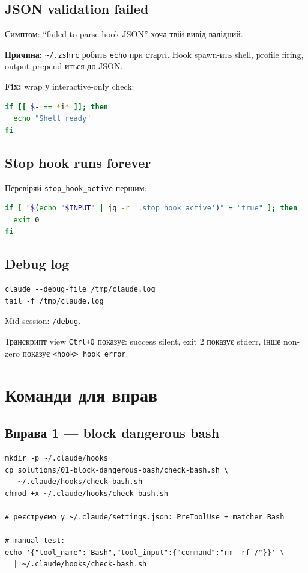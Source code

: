 \documentclass[11pt,a4paper]{article}
\begin{document}
\subsection{JSON validation failed}

Симптом: ``failed to parse hook JSON'' хоча твій вивід валідний.

\textbf{Причина:} \texttt{\textasciitilde/.zshrc} робить \texttt{echo} при старті. Hook spawn-ить shell, profile firing, output prepend-иться до JSON.

\textbf{Fix:} wrap у interactive-only check:

\begin{lstlisting}[language=bash]
if [[ $- == *i* ]]; then
  echo "Shell ready"
fi
\end{lstlisting}

\subsection{Stop hook runs forever}

Перевіряй \texttt{stop\_hook\_active} першим:

\begin{lstlisting}[language=bash]
if [ "$(echo "$INPUT" | jq -r '.stop_hook_active')" = "true" ]; then
  exit 0
fi
\end{lstlisting}

\subsection{Debug log}

\begin{lstlisting}
claude --debug-file /tmp/claude.log
tail -f /tmp/claude.log
\end{lstlisting}

Mid-session: \texttt{/debug}.

Транскрипт view \texttt{Ctrl+O} показує: success silent, exit 2 показує stderr, інше non-zero показує \texttt{<hook> hook error}.

\section{Команди для вправ}

\subsection{Вправа 1 --- block dangerous bash}

\begin{lstlisting}
mkdir -p ~/.claude/hooks
cp solutions/01-block-dangerous-bash/check-bash.sh \
   ~/.claude/hooks/check-bash.sh
chmod +x ~/.claude/hooks/check-bash.sh

# реєструємо у ~/.claude/settings.json: PreToolUse + matcher Bash

# manual test:
echo '{"tool_name":"Bash","tool_input":{"command":"rm -rf /"}}' \
  | ~/.claude/hooks/check-bash.sh
\end{lstlisting}
\end{document}
